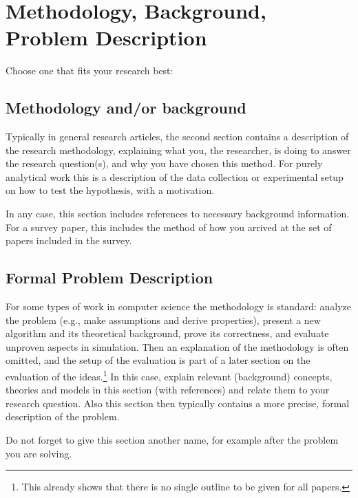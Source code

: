 \section{Methodology, Background, Problem Description}
Choose one that fits your research best:
\subsection{Methodology and/or background}
Typically in general research articles, the second section contains a description of the research methodology, explaining what you, the researcher, is doing to answer the research question(s), and why you have chosen this method.
For purely analytical work this is a description of the data collection or experimental setup on how to test the hypothesis, with a motivation.

In any case, this section includes references to necessary background information.
For a survey paper, this includes the method of how you arrived at the set of papers included in the survey.

\subsection{Formal Problem Description}
For some types of work in computer science the methodology is standard: analyze the problem (e.g., make assumptions and derive properties), present a new algorithm and its theoretical background, prove its correctness, and evaluate unproven aspects in simulation.
Then an explanation of the methodology is often omitted, and the setup of the evaluation is part of a later section on the evaluation of the ideas.\footnote{This already shows that there is no single outline to be given for all papers.}
In this case, explain relevant (background) concepts, theories and models in this section (with references) and relate them to your research question.
Also this section then typically contains a more precise, formal description of the problem.

Do not forget to give this section another name, for example after the problem you are solving.
